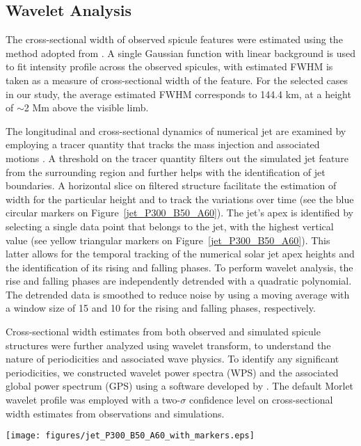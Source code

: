 \documentclass[12pt]{ociamthesis}
\begin{document}
\subsection{Wavelet Analysis} 
The cross-sectional width of observed spicule features were estimated using the method adopted from \citet{Sharma2018}. A single Gaussian function with linear background is used to fit intensity profile across the observed spicules, with estimated FWHM is taken as a measure of cross-sectional width of the feature. For the selected cases in our study, the average estimated FWHM corresponds to 144.4 km, at a height of $\sim$2 Mm above the visible limb.


The longitudinal and cross-sectional dynamics of numerical jet are examined by employing a tracer quantity that tracks the mass injection and associated motions \citep{Porth_2014}. A threshold on the tracer quantity filters out the simulated jet feature from the surrounding region and further helps with the identification of jet boundaries. A horizontal slice on filtered structure facilitate the estimation of width for the particular height and to track the variations over time (see the blue circular markers on  Figure~\ref{jet_P300_B50_A60}). The jet's apex is identified by selecting a single data point that belongs to the jet, with the highest vertical value (see yellow triangular markers on  Figure~\ref{jet_P300_B50_A60}). This latter allows for the temporal tracking of the numerical solar jet apex heights and the identification of its rising and falling phases. To perform wavelet analysis, the rise and falling phases are independently detrended with a quadratic polynomial. The detrended data is smoothed to reduce noise by using a moving average with a window size of 15 and 10 for the rising and falling phases, respectively.       

Cross-sectional width estimates from both observed and simulated spicule structures were further analyzed using wavelet transform, to understand the nature of periodicities and associated wave physics. To identify any significant periodicities, we constructed wavelet power spectra (WPS) and the associated global power spectrum (GPS) using a software developed by \cite{Torrence1998}. The default Morlet wavelet profile was employed with a two-$\sigma$ confidence level on cross-sectional width estimates from observations and simulations. 

\begin{figure*}
\texttt{[image: figures/jet\_P300\_B50\_A60\_with\_markers.eps]}
\caption{Panels showing the temporal evolution of the simulated spicule density structure at four time-steps with apex marked by a yellow triangle. From $121.08-243.88 ~\rm{s}$ ($366.68-489.48~\rm{s}$)  the rising (falling)-phase Location of tracers edges are also shown as blue dots, which are used to estimate the variations in cross-sectional width during rise- and fall-phases of jet structure.}
\label{jet_P300_B50_A60} 
\end{figure*}
\end{document}
